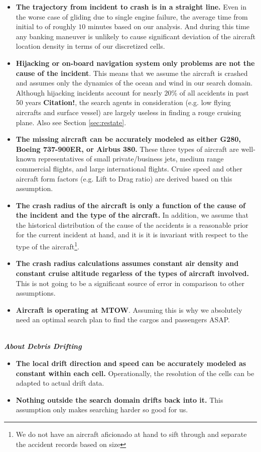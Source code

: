 \documentclass[12pt, letterpaper]{article}  %
\theoremstyle{definition}
\theoremstyle{remark}
\theoremstyle{plain}
\begin{document}
\begin{itemize}
\item \textbf{The trajectory from incident to crash is in a straight line.} Even in the worse case of gliding due to single engine failure, the average time from initial to of roughly $10$ minutes based on our analysis. And during this time any banking maneuver is unlikely to cause significant deviation of the aircraft location density in terms of our discretized cells.
\item \textbf{Hijacking or on-board navigation system only problems are not the cause of the incident}. This means that we assume the aircraft is crashed and assumes only the dynamics of the ocean and wind in our search domain. Although hijacking incidents account for nearly $20$\% of all accidents in past 50 years \textbf{Citation!}, the search agents in consideration (e.g. low flying aircrafts and surface vessel) are largely useless in finding a rouge cruising plane. Also see Section \ref{sec:restate}.
\item \textbf{The missing aircraft can be accurately modeled as either G280, Boeing 737-900ER, or Airbus 380.} These three types of aircraft are well-known representatives of small private/business jets, medium range commercial flights, and large international flights. Cruise speed and other aircraft form factors (e.g. Lift to Drag ratio) are derived based on this assumption.
\item \textbf{The crash radius of the aircraft is only a function of the cause of the incident and the type of the aircraft.} In addition, we assume that the historical distribution of the cause of the accidents is a reasonable prior for the current incident at hand, and it is it is invariant with respect to the type of the aircraft\footnote{We do not have an aircraft aficionado at hand to sift through and separate the accident records based on size}.
\item \textbf{The crash radius calculations assumes constant air density and constant cruise altitude regarless of the types of aircraft involved.} This is not going to be a significant source of error in comparison to other assumptions.
\item \textbf{Aircraft is operating at MTOW}. Assuming this is why we absolutely need an optimal search plan to find the cargos and passengers ASAP.
\end{itemize}

\ \\
\textit{\textbf{About Debris Drifting}}
\begin{itemize}
\item \textbf{The local drift direction and speed can be accurately modeled as constant within each cell.} Operationally, the resolution of the cells can be adapted to actual drift data.
\item \textbf{Nothing outside the search domain drifts back into it.} This assumption only makes searching harder so good for us.
\end{itemize}
\end{document}
